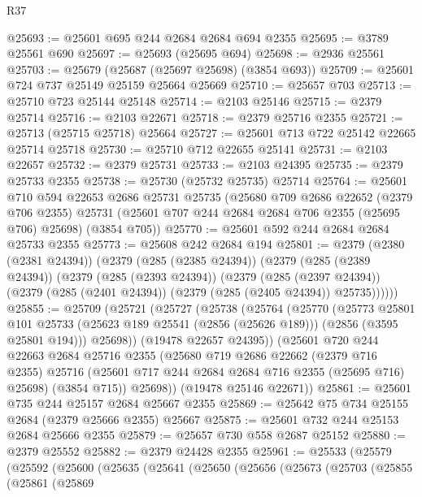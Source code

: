 \begin{lexlean}{R37}
\begin{coremodule}
@25693 := @25601 @695 @244 @2684 @2684 @694 @2355
@25695 := @3789 @25561 @690
@25697 := @25693 (@25695 @694)
@25698 := @2936 @25561
@25703 := @25679 (@25687 (@25697 @25698) (@3854 @693))
@25709 := @25601 @724 @737 @25149 @25159 @25664 @25669
@25710 := @25657 @703
@25713 := @25710 @723 @25144 @25148
@25714 := @2103 @25146
@25715 := @2379 @25714
@25716 := @2103 @22671
@25718 := @2379 @25716 @2355
@25721 := @25713 (@25715 @25718) @25664
@25727 := @25601 @713 @722 @25142 @22665 @25714 @25718
@25730 := @25710 @712 @22655 @25141
@25731 := @2103 @22657
@25732 := @2379 @25731
@25733 := @2103 @24395
@25735 := @2379 @25733 @2355
@25738 := @25730 (@25732 @25735) @25714
@25764 := @25601
    @710
    @594
    @22653
    @2686
    @25731
    @25735
    (@25680
      @709
      @2686
      @22652
      (@2379 @706 @2355)
      @25731
      (@25601 @707 @244 @2684 @2684 @706 @2355 (@25695 @706) @25698)
      (@3854 @705))
@25770 := @25601 @592 @244 @2684 @2684 @25733 @2355
@25773 := @25608 @242 @2684 @194
@25801 := @2379
    (@2380 (@2381 @24394))
    (@2379
      (@285 (@2385 @24394))
      (@2379
        (@285 (@2389 @24394))
        (@2379
          (@285 (@2393 @24394))
          (@2379
            (@285 (@2397 @24394))
            (@2379 (@285 (@2401 @24394)) (@2379 (@285 (@2405 @24394)) @25735))))))
@25855 := @25709
    (@25721
      (@25727
        (@25738
          (@25764
            (@25770
              (@25773
                @25801
                @101
                @25733
                (@25623 @189 @25541 (@2856 (@25626 @189)))
                (@2856 (@3595 @25801 @194)))
              @25698))
          (@19478 @22657 @24395))
        (@25601
          @720
          @244
          @22663
          @2684
          @25716
          @2355
          (@25680
            @719
            @2686
            @22662
            (@2379 @716 @2355)
            @25716
            (@25601 @717 @244 @2684 @2684 @716 @2355 (@25695 @716) @25698)
            (@3854 @715))
          @25698))
      (@19478 @25146 @22671))
@25861 := @25601 @735 @244 @25157 @2684 @25667 @2355
@25869 := @25642 @75 @734 @25155 @2684 (@2379 @25666 @2355) @25667
@25875 := @25601 @732 @244 @25153 @2684 @25666 @2355
@25879 := @25657 @730 @558 @2687 @25152
@25880 := @2379 @25552
@25882 := @2379 @24428 @2355
@25961 := @25533
    (@25579
      (@25592
        (@25600
          (@25635
            (@25641
              (@25650
                (@25656
                  (@25673
                    (@25703
                      (@25855
                        (@25861
                          (@25869

\end{coremodule}
\end{lexlean}
